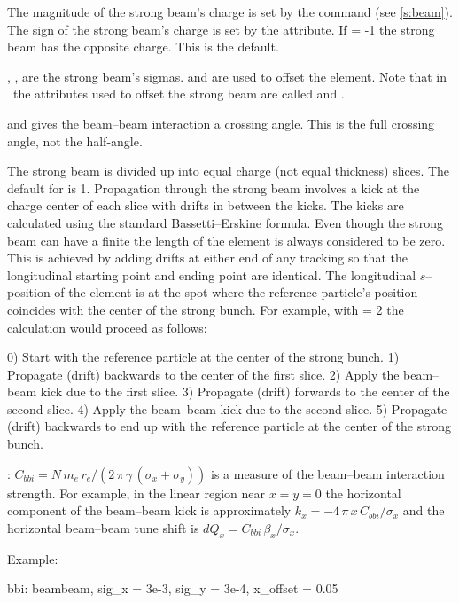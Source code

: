 The magnitude of the strong beam's charge is set by the 
command (see \ref{s:beam}).  The sign of the strong beam's charge is
set by the  attribute. If  = -1 the
strong beam has the opposite charge. This is the default.

, ,  are the strong beam's sigmas. 
 and  are used to offset the
 element. Note that in \mad\ the attributes used to
offset the strong beam are called  and .

 and  gives the beam--beam interaction a
crossing angle. This is the full crossing angle, not the half-angle.

The strong beam is divided up into  equal charge (not equal
thickness) slices. The default for  is 1. Propagation
through the strong beam involves a kick at the charge center of each
slice with drifts in between the kicks. The kicks are calculated using
the standard Bassetti--Erskine formula.  Even though the strong beam can
have a finite  the length of the element is always considered
to be zero. This is achieved by adding drifts at either end of any
tracking so that the longitudinal starting point and ending point are
identical. The longitudinal $s$--position of the
 element is at the spot where the reference particle's
position coincides with the center of the strong bunch. For example,
with  = 2 the calculation would proceed as follows:
\begin{example}
  0) Start with the reference particle at the center of the strong bunch.
  1) Propagate (drift) backwards to the center of the first slice.
  2) Apply the beam--beam kick due to the first slice.
  3) Propagate (drift) forwards to the center of the second slice.
  4) Apply the beam--beam kick due to the second slice.
  5) Propagate (drift) backwards to end up with the reference particle
     at the center of the strong bunch.
\end{example}

: $ C_{bbi} = 
N \, m_e \, r_e / (2 \, \pi \, \gamma \, (\sigma_x + \sigma_y))$ 
is a measure of the beam--beam interaction strength. For example,
in the linear region near $x = y = 0$ the horizontal component of the
beam--beam kick is approximately 
$k_x = -4\, \pi \, x \, C_{bbi} / \sigma_x$ and the
horizontal beam--beam tune shift is 
$dQ_x = C_{bbi} \, \beta_x / \sigma_x$.

Example:
\begin{example}
  bbi: beambeam, sig\_x = 3e-3, sig\_y = 3e-4, x\_offset = 0.05
\end{example}

